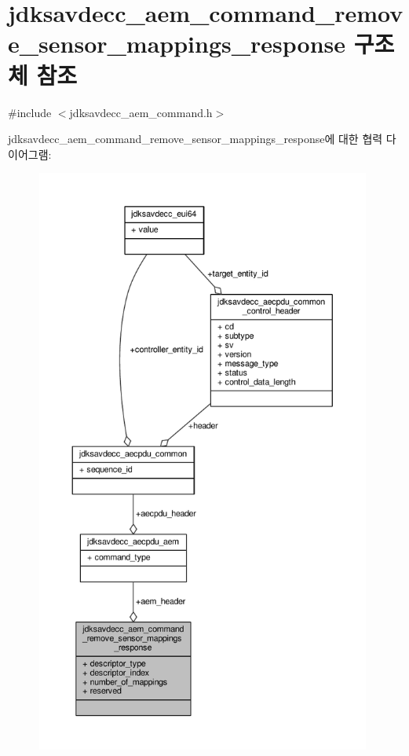 \hypertarget{structjdksavdecc__aem__command__remove__sensor__mappings__response}{}\section{jdksavdecc\+\_\+aem\+\_\+command\+\_\+remove\+\_\+sensor\+\_\+mappings\+\_\+response 구조체 참조}
\label{structjdksavdecc__aem__command__remove__sensor__mappings__response}


{\ttfamily \#include $<$jdksavdecc\+\_\+aem\+\_\+command.\+h$>$}



jdksavdecc\+\_\+aem\+\_\+command\+\_\+remove\+\_\+sensor\+\_\+mappings\+\_\+response에 대한 협력 다이어그램\+:
\nopagebreak
\begin{figure}[H]
\begin{center}
\leavevmode
\includegraphics[height=550pt]{structjdksavdecc__aem__command__remove__sensor__mappings__response__coll__graph}
\end{center}
\end{figure}
